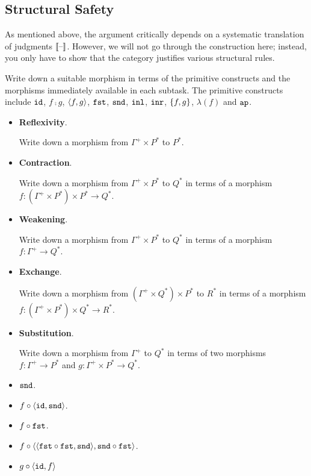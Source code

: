 \documentclass[12pt]{article}
\newcommand{\cut}[1]{}
\newcommand{\showsol}[1]{\color{FireBrick}#1\normalcolor}%
\newcommand{\showsol}[1]{\cut{#1}}%
\newenvironment{sol}{\trivlist \item[\hskip \labelsep{\bf
Solution:}]}{\endtrivlist}
\begin{document}
\subsection{Structural Safety}

As mentioned above, the argument critically
depends on a systematic translation of judgments $\llbracket \text{--}\rrbracket$.
However, we will not go through the construction here;
instead, you only have to show that the category justifies
various structural rules.

\begin{task}\label{task:struct}
  Write down a suitable morphism in terms of the primitive constructs
  and the morphisms immediately available in each subtask.
  The primitive constructs include
  $\mathtt{id}$, $f \comp g$, $\langle f,g\rangle$, $\mathtt{fst}$, $\mathtt{snd}$, $\mathtt{inl}$, $\mathtt{inr}$, $\{ f,g\}$, $\lambda(f)$ and $\mathtt{ap}$.
  \begin{itemize}
    \item
      \textbf{Reflexivity}.

      Write down a morphism from $\Gamma^+ \times P^*$ to $P^*$.
    \item
      \textbf{Contraction}.

      Write down a morphism from $\Gamma^+ \times P^*$ to $Q^*$
      in terms of a morphism
      $f : (\Gamma^+ \times P^*) \times P^* \to Q^*$.
    \item
      \textbf{Weakening}.

      Write down a morphism from $\Gamma^+ \times P^*$ to $Q^*$
      in terms of a morphism
      $f : \Gamma^+ \to Q^*$.
    \item
      \textbf{Exchange}.

      Write down a morphism from
      $(\Gamma^+ \times Q^*) \times P^*$ to $R^*$
      in terms of a morphism
      $f : (\Gamma^+ \times P^*) \times Q^* \to R^*$.
    \item
      \textbf{Substitution}.

      Write down a morphism from $\Gamma^+$ to $Q^*$ in terms of
      two morphisms
      $f : \Gamma^+ \to P^*$
      and
      $g : \Gamma^+ \times P^* \to Q^*$.
  \end{itemize}
\end{task}

\showsol{
  \begin{sol}\mbox{}
    \begin{itemize}
      \item $\mathtt{snd}$.
      \item $f \mathbin{\circ} \langle \mathtt{id},\mathtt{snd}\rangle$.
      \item $f \mathbin{\circ} \mathtt{fst}$.
      \item $f \mathbin{\circ} \langle \langle \mathtt{fst} \mathbin{\circ} \mathtt{fst},\mathtt{snd}\rangle,\mathtt{snd} \mathbin{\circ} \mathtt{fst}\rangle$.
      \item $g \mathbin{\circ} \langle \mathtt{id},f\rangle$
    \end{itemize}
  \end{sol}
}
\end{document}
